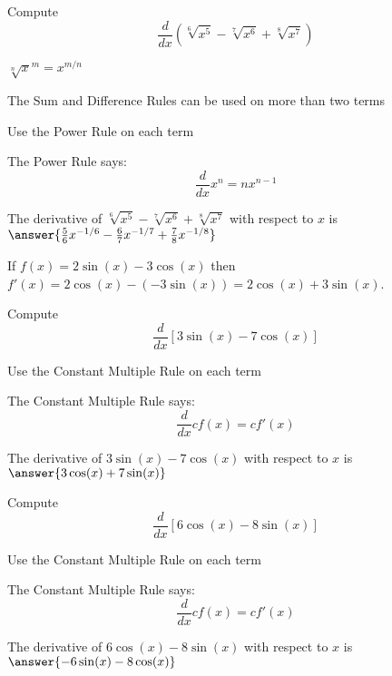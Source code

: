 \documentclass[handout]{ximera}
\begin{document}
\begin{problem} %
  Compute 
  \[
  \frac{d}{dx} (\sqrt[6] {x^5} - \sqrt[7] {x^6} + \sqrt[8] {x^7})
  \]
  
    \begin{hint}
		 $\sqrt[n] x^m = x^{m/n}$
		\end{hint}
		\begin{hint}
		  The Sum and Difference Rules can be used on more than two terms
		\end{hint}
		\begin{hint}
      Use the Power Rule on each term
    \end{hint}
    \begin{hint}
      The Power Rule says:
      \[
      \frac{d}{dx} x^n = nx^{n-1}
      \]
    \end{hint}    
		The derivative of $\sqrt[6] {x^5} - \sqrt[7] {x^6} + \sqrt[8] {x^7}$ with respect to $x$ is
		 $\answer{\frac56 x^{-1/6} - \frac67 x^{-1/7} + \frac78 x^{-1/8}}$
	
\end{problem}



\begin{example} %
 If $f(x) = 2\sin(x) - 3\cos(x)$ then $f'(x) = 2\cos(x) - (-3\sin(x)) = 2\cos(x) + 3\sin(x)$.
\end{example}


\begin{problem} %
  Compute 
  \[
  \frac{d}{dx} \left[3\sin(x) - 7\cos(x)\right]
  \]
  
		\begin{hint}
      Use the Constant Multiple Rule on each term
    \end{hint}
    \begin{hint}
      The Constant Multiple Rule says:
      \[
      \frac{d}{dx} cf(x) = cf'(x)
      \]
    \end{hint}    
		The derivative of $3\sin(x) - 7\cos(x)$ with respect to $x$ is
		 $\answer{3\cos(x) + 7\sin(x)}$
	
\end{problem}

\begin{problem} %
  Compute 
  \[
  \frac{d}{dx} \left[6\cos(x) - 8\sin(x)\right]
  \]
  
		\begin{hint}
      Use the Constant Multiple Rule on each term
    \end{hint}
    \begin{hint}
      The Constant Multiple Rule says:
      \[
      \frac{d}{dx} cf(x) = cf'(x)
      \]
    \end{hint}    
		The derivative of $6\cos(x) - 8\sin(x)$ with respect to $x$ is
		 $\answer{-6\sin(x) - 8\cos(x)}$
	
\end{problem}
\end{document}
